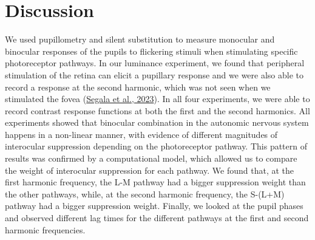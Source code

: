 \documentclass[
]{article}
\begin{document}
\hypertarget{discussion}{%
\section{Discussion}\label{discussion}}

We used pupillometry and silent substitution to measure monocular and binocular responses of the pupils to flickering stimuli when stimulating specific photoreceptor pathways. In our luminance experiment, we found that peripheral stimulation of the retina can elicit a pupillary response and we were also able to record a response at the second harmonic, which was not seen when we stimulated the fovea (\protect\hyperlink{ref-Segala2023}{Segala et al., 2023}). In all four experiments, we were able to record contrast response functions at both the first and the second harmonics. All experiments showed that binocular combination in the autonomic nervous system happens in a non-linear manner, with evidence of different magnitudes of interocular suppression depending on the photoreceptor pathway. This pattern of results was confirmed by a computational model, which allowed us to compare the weight of interocular suppression for each pathway. We found that, at the first harmonic frequency, the L-M pathway had a bigger suppression weight than the other pathways, while, at the second harmonic frequency, the S-(L+M) pathway had a bigger suppression weight. Finally, we looked at the pupil phases and observed different lag times for the different pathways at the first and second harmonic frequencies.
\end{document}
